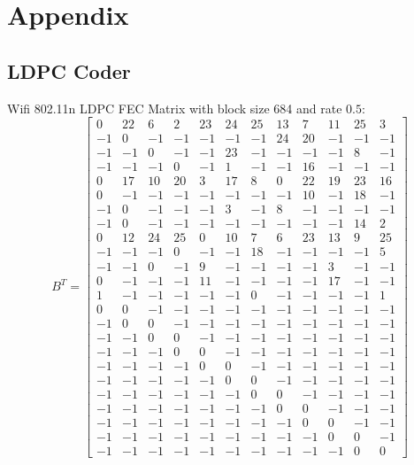 
\chapter{Appendix}
\section{LDPC Coder}
\setcounter{MaxMatrixCols}{200}
Wifi 802.11n LDPC FEC Matrix with block size 684 and rate $0.5$:
\begin{equation}
    B^T = \left[\begin{matrix}
         0 & 22 &  6 &  2 & 23 & 24 & 25 & 13 &  7 & 11 & 25 &  3 \\
        -1 &  0 & -1 & -1 & -1 & -1 & -1 & 24 & 20 & -1 & -1 & -1 \\
        -1 & -1 &  0 & -1 & -1 & 23 & -1 & -1 & -1 & -1 &  8 & -1 \\
        -1 & -1 & -1 &  0 & -1 &  1 & -1 & -1 & 16 & -1 & -1 & -1 \\
         0 & 17 & 10 & 20 &  3 & 17 &  8 &  0 & 22 & 19 & 23 & 16 \\
         0 & -1 & -1 & -1 & -1 & -1 & -1 & -1 & 10 & -1 & 18 & -1 \\
        -1 &  0 & -1 & -1 & -1 &  3 & -1 &  8 & -1 & -1 & -1 & -1 \\
        -1 &  0 & -1 & -1 & -1 & -1 & -1 & -1 & -1 & -1 & 14 &  2 \\
         0 & 12 & 24 & 25 &  0 & 10 &  7 &  6 & 23 & 13 &  9 & 25 \\
        -1 & -1 & -1 &  0 & -1 & -1 & 18 & -1 & -1 & -1 & -1 &  5 \\
        -1 & -1 &  0 & -1 &  9 & -1 & -1 & -1 & -1 &  3 & -1 & -1 \\
         0 & -1 & -1 & -1 & 11 & -1 & -1 & -1 & -1 & 17 & -1 & -1 \\
         1 & -1 & -1 & -1 & -1 & -1 &  0 & -1 & -1 & -1 & -1 &  1 \\
         0 &  0 & -1 & -1 & -1 & -1 & -1 & -1 & -1 & -1 & -1 & -1 \\
        -1 &  0 &  0 & -1 & -1 & -1 & -1 & -1 & -1 & -1 & -1 & -1 \\
        -1 & -1 &  0 &  0 & -1 & -1 & -1 & -1 & -1 & -1 & -1 & -1 \\
        -1 & -1 & -1 &  0 &  0 & -1 & -1 & -1 & -1 & -1 & -1 & -1 \\
        -1 & -1 & -1 & -1 &  0 &  0 & -1 & -1 & -1 & -1 & -1 & -1 \\
        -1 & -1 & -1 & -1 & -1 &  0 &  0 & -1 & -1 & -1 & -1 & -1 \\
        -1 & -1 & -1 & -1 & -1 & -1 &  0 &  0 & -1 & -1 & -1 & -1 \\
        -1 & -1 & -1 & -1 & -1 & -1 & -1 &  0 &  0 & -1 & -1 & -1 \\
        -1 & -1 & -1 & -1 & -1 & -1 & -1 & -1 &  0 &  0 & -1 & -1 \\
        -1 & -1 & -1 & -1 & -1 & -1 & -1 & -1 & -1 &  0 &  0 & -1 \\
        -1 & -1 & -1 & -1 & -1 & -1 & -1 & -1 & -1 & -1 &  0 &  0
    \end{matrix}\right]
\end{equation}
